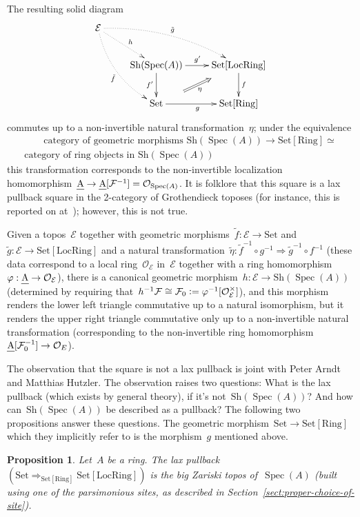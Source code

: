 \documentclass[10pt,reqno,a4paper]{amsbook}
\theoremstyle{definition}
\theoremstyle{plain}
\newtheorem{prop}[defn]{Proposition}
\theoremstyle{remark}
\newcommand{\E}{\mathcal{E}}
\newcommand{\F}{\mathcal{F}}
\renewcommand{\O}{\mathcal{O}}
\let\oldul\ul
\renewcommand{\ul}[1]{\text{\oldul{$#1$}}}
\newcommand{\Set}{\mathrm{Set}}
\newcommand{\Sh}{\mathrm{Sh}}
\newcommand{\Ring}{\mathrm{Ring}}
\newcommand{\LocRing}{\mathrm{LocRing}}
\DeclareMathOperator{\Spec}{Spec}
\newcommand{\?}{\,{:}\,}
\renewcommand{\_}{\mathpunct{.}\,}
\newcommand{\defeq}{\vcentcolon=}
\begin{document}
The resulting solid diagram
\[ \xymatrix{
  \E \ar@/^1pc/@{.>}[rrd]^{\tilde g} \ar@/_1pc/@{.>}[ddr]_{\tilde f} \ar@{.>}[rd]^h \\
  & \Sh(\Spec(A)) \ar[r]^{g'} \ar[d]_{f'} & \Set[\LocRing] \ar[d]^f \\
  & \Set \ar[r]_g \ar@{}[ur]^(.3){}="a"^(.7){}="b" \ar@{=>}_\eta "a";"b" & \Set[\Ring]
} \]
commutes up to a non-invertible natural transformation~$\eta$; under the
equivalence
\begin{multline*}
  \qquad\text{category of geometric morphisms~$\Sh(\Spec(A)) \to \Set[\Ring]$} \simeq \\
  \text{category of ring objects in~$\Sh(\Spec(A))$}\qquad
\end{multline*}
this transformation corresponds to the non-invertible localization homomorphism~$\ul{A} \to
\ul{A}[\F^{-1}] = \O_{\Spec(A)}$. It is folklore that this square is a lax
pullback square in the 2-category of Grothendieck toposes (for instance, this
is reported on at~\cite{arndt:lax-pullback}); however, this is not true.

Given a topos~$\E$ together with geometric morphisms~$\tilde f : \E \to \Set$
and~$\tilde g : \E \to \Set[\LocRing]$ and a natural transformation~$\tilde
\eta : \tilde f^{-1} \circ g^{-1} \Rightarrow \tilde g^{-1} \circ f^{-1}$
(these data correspond to a local ring~$\O_\E$ in~$\E$ together with a ring
homomorphism~$\varphi : \ul{A} \to \O_\E$), there is a canonical geometric morphism~$h :
\E \to \Sh(\Spec(A))$ (determined by requiring that~$h^{-1}\F \cong \F_0 \defeq
\varphi^{-1}[\O_\E^\times]$), and this morphism renders the lower left triangle
commutative up to a natural isomorphism, but it renders the upper right
triangle commutative only up to a non-invertible natural transformation
(corresponding to the non-invertible ring homomorphism~$\ul{A}[\F_0^{-1}] \to
\O_E$).

The observation that the square is not a lax pullback is joint with Peter Arndt
and Matthias Hutzler. The observation raises two questions: What is the lax
pullback (which exists by general theory), if it's not~$\Sh(\Spec(A))$?
And how can~$\Sh(\Spec(A))$ be described as a pullback? The following two
propositions answer these questions. The geometric morphism~$\Set \to
\Set[\Ring]$ which they implicitly refer to is the morphism~$g$ mentioned
above.

\begin{prop}Let~$A$ be a ring. The lax pullback~$(\Set \Rightarrow_{\Set[\Ring]}
\Set[\LocRing])$ is the big Zariski topos of~$\Spec(A)$ (built using one of the
parsimonious sites, as described in Section~\ref{sect:proper-choice-of-site}).
\end{prop}
\end{document}
